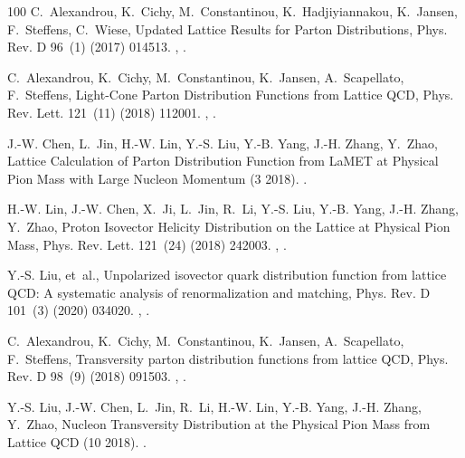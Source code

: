 \begin{thebibliography}{100}
C.~Alexandrou, K.~Cichy, M.~Constantinou, K.~Hadjiyiannakou, K.~Jansen,
  F.~Steffens, C.~Wiese, {Updated Lattice Results for Parton Distributions},
  Phys. Rev. D 96~(1) (2017) 014513.
\newblock \href {http://arxiv.org/abs/1610.03689} {},
  \href {https://doi.org/10.1103/PhysRevD.96.014513}
  {}.

C.~Alexandrou, K.~Cichy, M.~Constantinou, K.~Jansen, A.~Scapellato,
  F.~Steffens, {Light-Cone Parton Distribution Functions from Lattice QCD},
  Phys. Rev. Lett. 121~(11) (2018) 112001.
\newblock \href {http://arxiv.org/abs/1803.02685} {},
  \href {https://doi.org/10.1103/PhysRevLett.121.112001}
  {}.

J.-W. Chen, L.~Jin, H.-W. Lin, Y.-S. Liu, Y.-B. Yang, J.-H. Zhang, Y.~Zhao,
  {Lattice Calculation of Parton Distribution Function from LaMET at Physical
  Pion Mass with Large Nucleon Momentum} (3 2018).
\newblock \href {http://arxiv.org/abs/1803.04393} {}.

H.-W. Lin, J.-W. Chen, X.~Ji, L.~Jin, R.~Li, Y.-S. Liu, Y.-B. Yang, J.-H.
  Zhang, Y.~Zhao, {Proton Isovector Helicity Distribution on the Lattice at
  Physical Pion Mass}, Phys. Rev. Lett. 121~(24) (2018) 242003.
\newblock \href {http://arxiv.org/abs/1807.07431} {},
  \href {https://doi.org/10.1103/PhysRevLett.121.242003}
  {}.

Y.-S. Liu, et~al., {Unpolarized isovector quark distribution function from
  lattice QCD: A systematic analysis of renormalization and matching}, Phys.
  Rev. D 101~(3) (2020) 034020.
\newblock \href {http://arxiv.org/abs/1807.06566} {},
  \href {https://doi.org/10.1103/PhysRevD.101.034020}
  {}.

C.~Alexandrou, K.~Cichy, M.~Constantinou, K.~Jansen, A.~Scapellato,
  F.~Steffens, {Transversity parton distribution functions from lattice QCD},
  Phys. Rev. D 98~(9) (2018) 091503.
\newblock \href {http://arxiv.org/abs/1807.00232} {},
  \href {https://doi.org/10.1103/PhysRevD.98.091503}
  {}.

Y.-S. Liu, J.-W. Chen, L.~Jin, R.~Li, H.-W. Lin, Y.-B. Yang, J.-H. Zhang,
  Y.~Zhao, {Nucleon Transversity Distribution at the Physical Pion Mass from
  Lattice QCD} (10 2018).
\newblock \href {http://arxiv.org/abs/1810.05043} {}.


\end{thebibliography}
